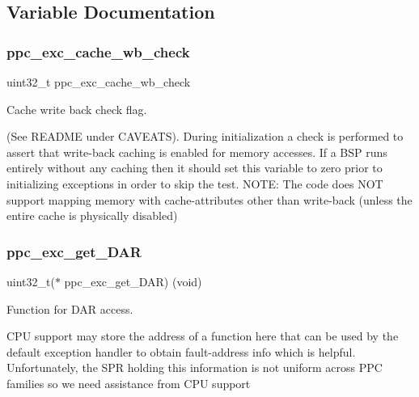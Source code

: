 \subsection{Variable Documentation}
\mbox{\label{group__ppc__exc_ga36457bfd67a9428bc8bef14844265c3f}} 
\subsubsection{\texorpdfstring{ppc\_exc\_cache\_wb\_check}{ppc\_exc\_cache\_wb\_check}}
{\footnotesize\ttfamily uint32\+\_\+t ppc\+\_\+exc\+\_\+cache\+\_\+wb\+\_\+check}



Cache write back check flag. 

(See R\+E\+A\+D\+ME under C\+A\+V\+E\+A\+TS). During initialization a check is performed to assert that write-\/back caching is enabled for memory accesses. If a B\+SP runs entirely without any caching then it should set this variable to zero prior to initializing exceptions in order to skip the test. N\+O\+TE\+: The code does N\+OT support mapping memory with cache-\/attributes other than write-\/back (unless the entire cache is physically disabled) \mbox{\label{group__ppc__exc_ga1f0a427c9ea16c5cf5a4d9a3f6003541}} 
\subsubsection{\texorpdfstring{ppc\_exc\_get\_DAR}{ppc\_exc\_get\_DAR}}
{\footnotesize\ttfamily uint32\+\_\+t($\ast$ ppc\+\_\+exc\+\_\+get\+\_\+\+D\+AR) (void)}



Function for D\+AR access. 

C\+PU support may store the address of a function here that can be used by the default exception handler to obtain fault-\/address info which is helpful. Unfortunately, the S\+PR holding this information is not uniform across P\+PC families so we need assistance from C\+PU support \mbox{\label{group__ppc__exc_gadfcca9bce17fda755db0ead10c374e60}} 
